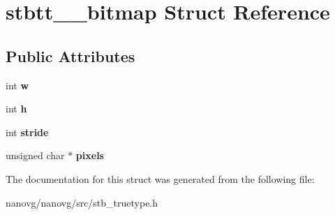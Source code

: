 \hypertarget{structstbtt____bitmap}{\section{stbtt\+\_\+\+\_\+bitmap Struct Reference}
\label{structstbtt____bitmap}
}
\subsection*{Public Attributes}
\begin{DoxyCompactItemize}
\item 
\hypertarget{structstbtt____bitmap_afbd607426f0a457b1a871ed902eeb926}{int {\bfseries w}}\label{structstbtt____bitmap_afbd607426f0a457b1a871ed902eeb926}

\item 
\hypertarget{structstbtt____bitmap_a2afc802e26e9f1dda897ac16ecfff10e}{int {\bfseries h}}\label{structstbtt____bitmap_a2afc802e26e9f1dda897ac16ecfff10e}

\item 
\hypertarget{structstbtt____bitmap_a48ee6b550ee4f1d85bfc32c62c0e9a98}{int {\bfseries stride}}\label{structstbtt____bitmap_a48ee6b550ee4f1d85bfc32c62c0e9a98}

\item 
\hypertarget{structstbtt____bitmap_ae6be77625faf55b110eaaffde5c7733c}{unsigned char $\ast$ {\bfseries pixels}}\label{structstbtt____bitmap_ae6be77625faf55b110eaaffde5c7733c}

\end{DoxyCompactItemize}


The documentation for this struct was generated from the following file\+:\begin{DoxyCompactItemize}
\item 
nanovg/nanovg/src/stb\+\_\+truetype.\+h\end{DoxyCompactItemize}
